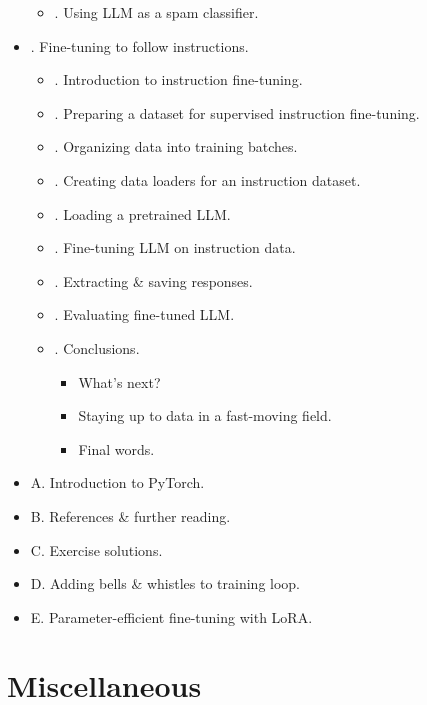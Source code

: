 \documentclass{article}
\begin{document}
\begin{itemize}
\begin{itemize}
		\item {. Using LLM as a spam classifier.}
	\end{itemize}
	\item {. Fine-tuning to follow instructions.}
	\begin{itemize}
		\item {. Introduction to instruction fine-tuning.}
		\item {. Preparing a dataset for supervised instruction fine-tuning.}
		\item {. Organizing data into training batches.}
		\item {. Creating data loaders for an instruction dataset.}
		\item {. Loading a pretrained LLM.}
		\item {. Fine-tuning LLM on instruction data.}
		\item {. Extracting \& saving responses.}
		\item {. Evaluating fine-tuned LLM.}
		\item {. Conclusions.}
		\begin{itemize}
			\item {\sf What's next?}
			\item {\sf Staying up to data in a fast-moving field.}
			\item {\sf Final words.}
		\end{itemize}
	\end{itemize}
	\item {\sf A. Introduction to PyTorch.}
	\item {\sf B. References \& further reading.}
	\item {\sf C. Exercise solutions.}
	\item {\sf D. Adding bells \& whistles to training loop.}
	\item {\sf E. Parameter-efficient fine-tuning with LoRA.}
\end{itemize}


\section{Miscellaneous}


\printbibliography[heading=bibintoc]
	
\end{document}
